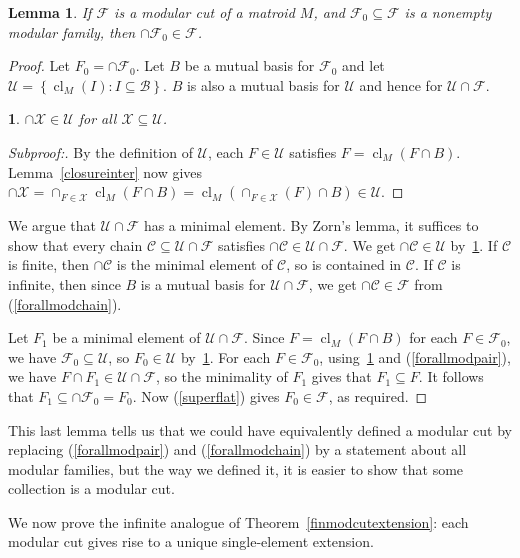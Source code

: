 \documentclass{amsart}
\theoremstyle{plain}
\newtheorem{claim}{}[theorem]
\newtheorem{lemma}[theorem]{Lemma}
\theoremstyle{definition}
\newcommand{\cB}{\mathcal{B}}
\newcommand{\cC}{\mathcal{C}}
\newcommand{\cF}{\mathcal{F}}
\newcommand{\cU}{\mathcal{U}}
\newcommand{\cX}{\mathcal{X}}
\DeclareMathOperator{\cl}{cl}
\newcommand{\set}[1]{\left\{#1\right\}}
\newcommand{\br}[1]{\left(#1\right)}
\renewcommand{\ss}{\subseteq}
\newenvironment{subproof}[1][\proofname]{%
  \renewcommand{\qedsymbol}{$\blacksquare$}%
  \begin{proof}[Subproof:]%
}{%
  \end{proof}%
}
\begin{document}
\begin{lemma}\label{modcutinter}
  If $\cF$ is a modular cut of a matroid $M$, and $\cF_0 \subseteq \cF$ is a nonempty 
  modular family, then $\cap \cF_0 \in \cF$. 
\end{lemma}
\begin{proof}
  Let $F_0 = \cap \cF_0$. 
  Let $B$ be a mutual basis for $\cF_0$ and let $\cU = \set{\cl_M(I) \colon I \ss \cB}$. 
  $B$ is also a mutual basis for $\cU$ and hence for $\cU \cap \cF$. 
  
  \begin{claim}\label{uclinter}
    $\cap \cX \in \cU$ for all $\cX \ss \cU$.
  \end{claim}
  \begin{subproof}
    By the definition of $\cU$, each $F \in \cU$ satisfies $F = \cl_M(F \cap B)$.
    Lemma~\ref{closureinter} now gives 
  $\cap \cX = \cap_{F \in \cX}\cl_M(F \cap B) = \cl_M\br{\cap_{F \in \cX}(F) \cap B} \in \cU$.
  \end{subproof}
  
  
  We argue that $\cU \cap \cF$ has a minimal element. By Zorn's lemma, it suffices to 
  show that every chain $\cC \ss \cU \cap \cF$ satisfies $\cap \cC \in \cU \cap \cF$. 
  We get $\cap \cC \in \cU$ by~\ref{uclinter}. 
  If $\cC$ is finite, then $\cap \cC$ is the minimal element of $\cC$, so is contained in $\cC$.
  If $\cC$ is infinite, then since $B$ is a mutual basis for $\cU \cap \cF$, we get
  $\cap \cC \in \cF$ from (\ref{forallmodchain}). 

  Let $F_1$ be a minimal element of $\cU \cap \cF$. 
  Since $F = \cl_M(F \cap B)$ for each $F \in \cF_0$, 
  we have $\cF_0 \ss \cU$, so $F_0 \in \cU$ by~\ref{uclinter}. 
  For each $F \in \cF_0$, using~\ref{uclinter} and (\ref{forallmodpair}), 
  we have $F \cap F_1 \in \cU \cap \cF$, 
  so the minimality of $F_1$ gives that $F_1 \ss F$. It follows that $F_1 \ss \cap \cF_0 = F_0$. 
  Now (\ref{superflat}) gives $F_0 \in \cF$, as required. 
\end{proof}

This last lemma tells us that we could have equivalently defined a modular cut by replacing 
(\ref{forallmodpair}) 
and (\ref{forallmodchain}) by a statement about all modular families, but the way we defined it, 
it is easier to show that some collection is a modular cut.

We now prove the infinite analogue of Theorem~\ref{finmodcutextension}: each modular cut 
gives rise to a unique single-element extension. 
\end{document}
